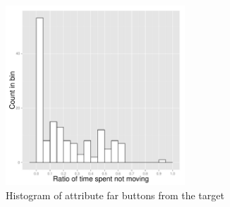\begin{figure}[!htbp]
  \centering
	\includegraphics[page=9,width=0.6\textwidth]{Images/chains_features_ML}
	\caption{Histogram of attribute far buttons from the target}
	\label{fig:chains-distrib-far}
\end{figure}